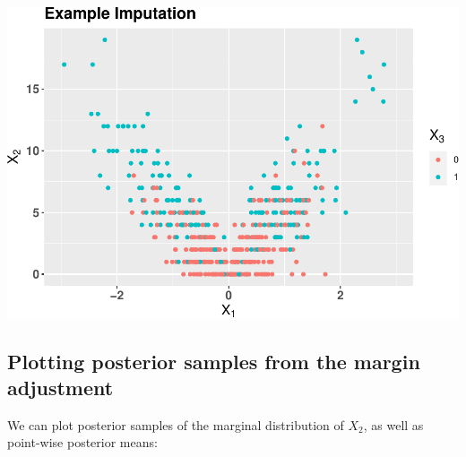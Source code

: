 \documentclass[
]{article}
\begin{document}
\includegraphics{README_files/figure-latex/unnamed-chunk-4-1.pdf}

\hypertarget{plotting-posterior-samples-from-the-margin-adjustment}{%
\subsection{Plotting posterior samples from the margin
adjustment}\label{plotting-posterior-samples-from-the-margin-adjustment}}

We can plot posterior samples of the marginal distribution of \(X_{2}\),
as well as point-wise posterior means:
\end{document}
